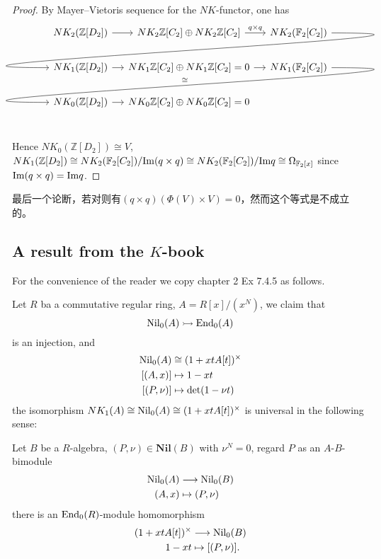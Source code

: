 \begin{proof}
    By Mayer–Vietoris sequence for the $NK$-functor, one has
    \[\begin{tikzcd}[column sep=small]
		 NK_2(\mathbb{Z}[D_2]) \ar[r] & NK_2 \mathbb{Z}[C_2] \oplus NK_2 \mathbb{Z}[C_2] \ar[r,"q\times q"] & NK_2(\mathbb{F}_2[C_2]) \ar[out=0, in=180, looseness=2, overlay]{dll}   \\
		  NK_1(\mathbb{Z}[D_2]) \ar[r]  & NK_1 \mathbb{Z}[C_2] \oplus NK_1 \mathbb{Z}[C_2]=0 \ar[r]& NK_1(\mathbb{F}_2[C_2])  \ar[out=0, in=180, looseness=2, overlay,"\cong"']{dll}   \\
		 NK_0(\mathbb{Z}[D_2]) \ar[r]  & NK_0 \mathbb{Z}[C_2] \oplus NK_0 \mathbb{Z}[C_2] =0 \\
	\end{tikzcd}\]

	Hence $NK_0(\mathbb{Z}[D_2])\cong V$, $NK_1(\mathbb{Z}[D_2])\cong NK_2(\mathbb{F}_2[C_2])/\mathrm{Im}(q\times q) \cong NK_2(\mathbb{F}_2[C_2])/\mathrm{Im} q\cong \Omega_{\mathbb{F}_2[x]}$ since $\mathrm{Im}(q\times q)=\mathrm{Im} q$.
\end{proof}
最后一个论断，若对则有$(q\times q)(\Phi(V)\times V)=0$，然而这个等式是不成立的。

\subsection{A result from the $K$-book}
For the convenience of the reader we copy \cite{weibel2013k} chapter 2 Ex 7.4.5 as follows.

Let $R$ ba a commutative regular ring, $A=R[x]/(x^N)$, we claim that
\[\mathrm{Nil}_0(A) \rightarrowtail \mathrm{End}_0(A)\]
is an injection, and 
\begin{align*}
\mathrm{Nil}_0(A)&\cong (1+xtA[t])^{\times}\\
[(A,x)] &\mapsto 1-xt \\
[(P,\nu)] & \mapsto \det(1-\nu t)
\end{align*}
the isomorphism $NK_1(A)\cong \mathrm{Nil}_0(A)\cong (1+xtA[t])^{\times}$ is universal in the following sense:

Let $B$ be a $R$-algebra, $(P,\nu) \in \mathbf{Nil}(B)$ with $\nu^N=0$, regard $P$ as an $A$-$B$-bimodule
\begin{align*}
\mathrm{Nil}_0(A) &\longrightarrow \mathrm{Nil}_0(B)\\
(A,x) & \mapsto (P,\nu)
\end{align*}
there is an $\mathrm{End}_0(R)$-module homomorphism
\begin{align*}
(1+xtA[t])^{\times}&\longrightarrow \mathrm{Nil}_0(B) \\
 1-xt&\mapsto [(P,\nu)].
\end{align*}


